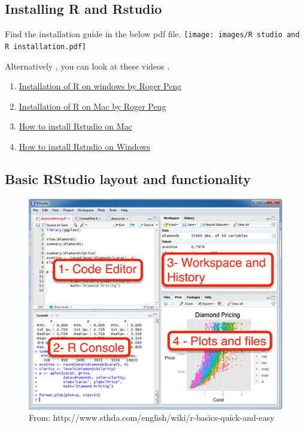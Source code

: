 \documentclass[
]{book}
\providecommand{\tightlist}{%
  \setlength{\itemsep}{0pt}\setlength{\parskip}{0pt}}
\begin{document}
\subsection*{Installing R and Rstudio}\label{installing-r-and-rstudio}

Find the installation guide in the below pdf file.
\texttt{[image: images/R studio and R installation.pdf]}

Alternatively , you can look at these videos .

\begin{enumerate}
\def\labelenumi{\arabic{enumi}.}
\tightlist
\item
  \href{https://www.youtube.com/watch?v=Ohnk9hcxf9M}{Installation of R on windows by Roger Peng}
\item
  \href{https://www.youtube.com/watch?v=uxuuWXU-7UQ&feature=youtu.be&themeRefresh=1&theme=dark}{Installation of R on Mac by Roger Peng}
\item
  \href{https://www.youtube.com/watch?v=n8kP7c_QbLA}{How to install Rstudio on Mac}
\item
  \href{https://www.youtube.com/watch?v=YrEe2TLr3MI}{How to install Rstudio on Windows}
\end{enumerate}

\subsection*{Basic RStudio layout and functionality}\label{basic-rstudio-layout-and-functionality}

\begin{figure}
\includegraphics[width=0.8\linewidth]{images/rstudio_layout} \caption{From: http://www.sthda.com/english/wiki/r-basics-quick-and-easy }\label{fig:unnamed-chunk-3}
\end{figure}
\end{document}
